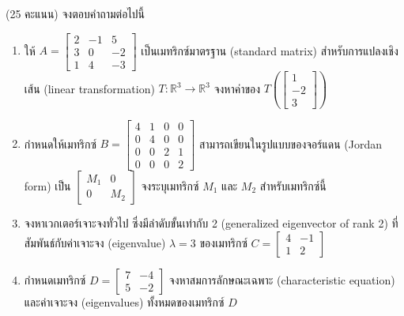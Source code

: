 \documentclass[12pt, a4paper]{exam}
\begin{document}
\begin{questions}

\question (25 คะแนน) จงตอบคำถามต่อไปนี้
\begin{enumerate}[label=\textbf{1.\arabic*)}]
    \item ให้ $A = \begin{bmatrix} 2 & -1 & 5 \\ 3 & 0 & -2 \\ 1 & 4 & -3 \end{bmatrix}$ เป็นเมทริกซ์มาตรฐาน (standard matrix) สำหรับการแปลงเชิงเส้น (linear transformation) $T : \mathbb{R}^3 \to \mathbb{R}^3$ จงหาค่าของ $T\left(\begin{bmatrix} 1 \\ -2 \\ 3 \end{bmatrix}\right)$
    \item กำหนดให้เมทริกซ์ $B = \begin{bmatrix} 4 & 1 & 0 & 0 \\ 0 & 4 & 0 & 0 \\ 0 & 0 & 2 & 1 \\ 0 & 0 & 0 & 2 \end{bmatrix}$ สามารถเขียนในรูปแบบของจอร์แดน (Jordan form) เป็น $\begin{bmatrix} M_1 & 0 \\ 0 & M_2 \end{bmatrix}$ จงระบุเมทริกซ์ $M_1$ และ $M_2$ สำหรับเมทริกซ์นี้
    \item จงหาเวกเตอร์เจาะจงทั่วไป ซึ่งมีลำดับขั้นเท่ากับ 2 (generalized eigenvector of rank 2) ที่สัมพันธ์กับค่าเจาะจง (eigenvalue) $\lambda = 3$ ของเมทริกซ์ $C = \begin{bmatrix} 4 & -1 \\ 1 & 2 \end{bmatrix}$
    \item กำหนดเมทริกซ์ $D = \begin{bmatrix} 7 & -4 \\ 5 & -2 \end{bmatrix}$ จงหาสมการลักษณะเฉพาะ (characteristic equation) และค่าเจาะจง (eigenvalues) ทั้งหมดของเมทริกซ์ $D$
\end{enumerate}
\newpage


\end{questions}
\end{document}
